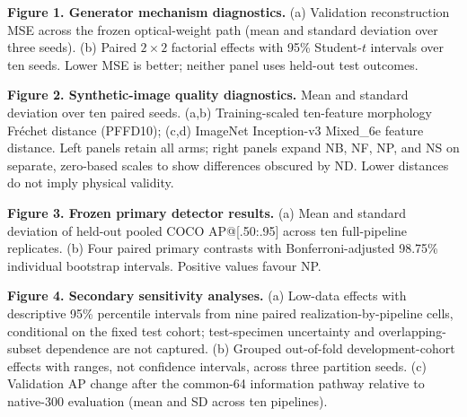 \textbf{Figure 1. Generator mechanism diagnostics.} (a) Validation reconstruction MSE across the frozen optical-weight path (mean and standard deviation over three seeds). (b) Paired $2\times2$ factorial effects with 95\% Student-$t$ intervals over ten seeds. Lower MSE is better; neither panel uses held-out test outcomes.\par
\textbf{Figure 2. Synthetic-image quality diagnostics.} Mean and standard deviation over ten paired seeds. (a,b) Training-scaled ten-feature morphology Fr\'echet distance (PFFD10); (c,d) ImageNet Inception-v3 Mixed\_6e feature distance. Left panels retain all arms; right panels expand NB, NF, NP, and NS on separate, zero-based scales to show differences obscured by ND. Lower distances do not imply physical validity.\par
\textbf{Figure 3. Frozen primary detector results.} (a) Mean and standard deviation of held-out pooled COCO AP@[.50:.95] across ten full-pipeline replicates. (b) Four paired primary contrasts with Bonferroni-adjusted 98.75\% individual bootstrap intervals. Positive values favour NP.\par
\textbf{Figure 4. Secondary sensitivity analyses.} (a) Low-data effects with descriptive 95\% percentile intervals from nine paired realization-by-pipeline cells, conditional on the fixed test cohort; test-specimen uncertainty and overlapping-subset dependence are not captured. (b) Grouped out-of-fold development-cohort effects with ranges, not confidence intervals, across three partition seeds. (c) Validation AP change after the common-64 information pathway relative to native-300 evaluation (mean and SD across ten pipelines).
